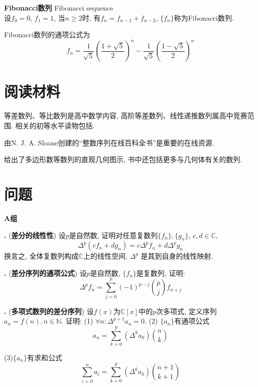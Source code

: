 \begin{dfn}\textbf{Fibonacci数列} Fibonacci sequence\\
设$f_0=0$, $f_1=1$, 当$n\ge 2$时, 有$f_n=f_{n-1}+f_{n-2}$, $\{f_n\}$称为Fibonacci数列. 
\end{dfn}
Fibonacci数列的通项公式为
\begin{equation}
    f_n = \frac{1}{\sqrt{5}}\left(\frac{1+\sqrt{5}}{2}\right)^n - \frac{1}{\sqrt{5}}\left(\frac{1-\sqrt{5}}{2}\right)^n
\end{equation}

\section*{阅读材料}
\par 等差数列、等比数列是高中数学内容, 高阶等差数列、线性递推数列属高中竞赛范围. 相关的初等水平读物包括\cite{SMI}. 

\par 由N. J. A. Sloane创建的``整数序列在线百科全书''\cite{OEIS}是重要的在线资源. 

\par \cite{BN}给出了多边形数等数列的直观几何图示, 书中还包括更多与几何体有关的数列. 

\section*{问题}

\par \textbf{A组}

\par \textbf{\theprobseq .} (\textbf{差分的线性性}) 设$p$是自然数, 证明对任意复数列$\{f_n\}, \{g_n\}$, $c,d \in \mathbb{C}$, 
\begin{equation}
    \Delta^p (cf_n+dg_n)=c\Delta^p f_n + d \Delta^p g_n
\end{equation}
换言之, 全体复数列构成$\mathbb{C}$上的线性空间, $\Delta^p$ 是其到自身的线性映射. 

\par \textbf{\theprobseq .} (\textbf{差分序列的通项公式}) 设$p$是自然数, $\{f_n\}$是复数列, 证明:
\begin{equation}
   \Delta^p f_n = \sum_{j=0}^p (-1)^{p-j} \binom{p}{j} f_{n+j} 
\end{equation}


\par \textbf{\theprobseq .} (\textbf{多项式数列的差分序列}) 设$f(x)$为$\mathbb{C}[x]$中的$p$次多项式, 定义序列$a_n=f(n), n\in \mathbb{N}$. 证明: (1) $\forall n: \Delta^{p+1} a_n=0$. (2) $\{a_n\}$有通项公式
\begin{equation}
    a_n = \sum_{k=0}^p (\Delta^k a_0) \binom{n}{k}
\end{equation}
\par (3)$\{a_n\}$有求和公式
\begin{equation}
    \sum_{i=0}^n a_i = \sum_{k=0}^p (\Delta^k a_0) \binom{n+1}{k+1}
\end{equation}


